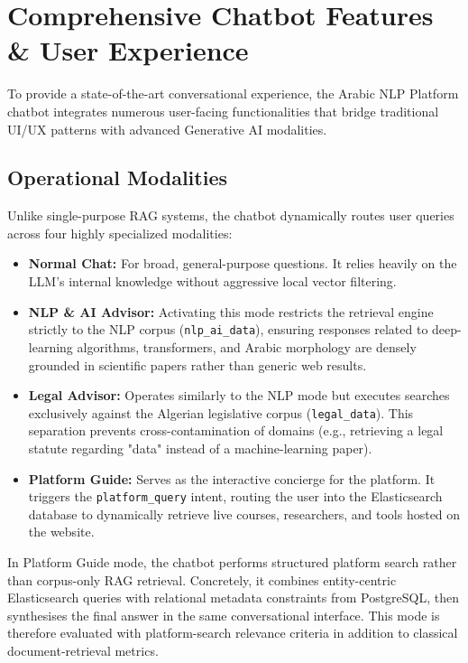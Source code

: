 \documentclass[12pt, a4paper]{article}
\begin{document}
\section{Comprehensive Chatbot Features \& User Experience}
\label{sec:feature_set}

To provide a state-of-the-art conversational experience, the Arabic NLP Platform chatbot integrates numerous user-facing functionalities that bridge traditional UI/UX patterns with advanced Generative AI modalities.

\subsection{Operational Modalities}
Unlike single-purpose RAG systems, the chatbot dynamically routes user queries across four highly specialized modalities:
\begin{itemize}[leftmargin=2em]
  \item \textbf{Normal Chat:} For broad, general-purpose questions. It relies heavily on the LLM's internal knowledge without aggressive local vector filtering.
  \item \textbf{NLP \& AI Advisor:} Activating this mode restricts the retrieval engine strictly to the NLP corpus (\texttt{nlp\_ai\_data}), ensuring responses related to deep-learning algorithms, transformers, and Arabic morphology are densely grounded in scientific papers rather than generic web results.
  \item \textbf{Legal Advisor:} Operates similarly to the NLP mode but executes searches exclusively against the Algerian legislative corpus (\texttt{legal\_data}). This separation prevents cross-contamination of domains (e.g., retrieving a legal statute regarding "data" instead of a machine-learning paper).
  \item \textbf{Platform Guide:} Serves as the interactive concierge for the platform. It triggers the \texttt{platform\_query} intent, routing the user into the Elasticsearch database to dynamically retrieve live courses, researchers, and tools hosted on the website.
\end{itemize}

In Platform Guide mode, the chatbot performs structured platform search rather
than corpus-only RAG retrieval. Concretely, it combines entity-centric
Elasticsearch queries with relational metadata constraints from PostgreSQL,
then synthesises the final answer in the same conversational interface. This
mode is therefore evaluated with platform-search relevance criteria in addition
to classical document-retrieval metrics.
\end{document}
